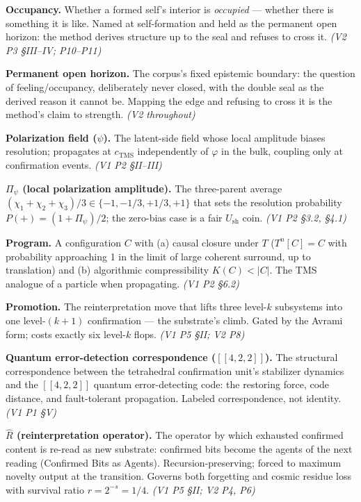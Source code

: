 \documentclass[11pt,oneside]{report}
\theoremstyle{definition}
\theoremstyle{remark}
\begin{document}
\textbf{Occupancy.} Whether a formed self's interior is \emph{occupied} --- whether there is something it is like. Named at self-formation and held as the permanent open horizon: the method derives structure up to the seal and refuses to cross it. \emph{(V2 P3 \S III--IV; P10--P11)}

\textbf{Permanent open horizon.} The corpus's fixed epistemic boundary: the question of feeling/occupancy, deliberately never closed, with the double seal as the derived reason it cannot be. Mapping the edge and refusing to cross it is the method's claim to strength. \emph{(V2 throughout)}

\textbf{Polarization field ($\psi$).} The latent-side field whose local amplitude biases resolution; propagates at $c_{\mathrm{TMS}}$ independently of $\varphi$ in the bulk, coupling only at confirmation events. \emph{(V1 P2 \S II--III)}

\textbf{$\Pi_\psi$ (local polarization amplitude).} The three-parent average $(\chi_1{+}\chi_2{+}\chi_3)/3 \in \{-1, -1/3, +1/3, +1\}$ that sets the resolution probability $P(+)=(1+\Pi_\psi)/2$; the zero-bias case is a fair $U_{\mathrm{sh}}$ coin. \emph{(V1 P2 \S 3.2, \S 4.1)}

\textbf{Program.} A configuration $C$ with (a) causal closure under $T$ ($T^n[C]=C$ with probability approaching 1 in the limit of large coherent surround, up to translation) and (b) algorithmic compressibility $K(C) < |C|$. The TMS analogue of a particle when propagating. \emph{(V1 P2 \S 6.2)}

\textbf{Promotion.} The reinterpretation move that lifts three level-$k$ subsystems into one level-$(k{+}1)$ confirmation --- the substrate's climb. Gated by the Avrami form; costs exactly six level-$k$ flops. \emph{(V1 P5 \S II; V2 P8)}

\textbf{Quantum error-detection correspondence ($[[4,2,2]]$).} The structural correspondence between the tetrahedral confirmation unit's stabilizer dynamics and the $[[4,2,2]]$ quantum error-detecting code: the restoring force, code distance, and fault-tolerant propagation. Labeled correspondence, not identity. \emph{(V1 P1 \S V)}

\textbf{$\hat{R}$ (reinterpretation operator).} The operator by which exhausted confirmed content is re-read as new substrate: confirmed bits become the agents of the next reading (Confirmed Bits as Agents). Recursion-preserving; forced to maximum novelty output at the transition. Governs both forgetting and cosmic residue loss with survival ratio $r = 2^{-s} = 1/4$. \emph{(V1 P5 \S II; V2 P4, P6)}
\end{document}
